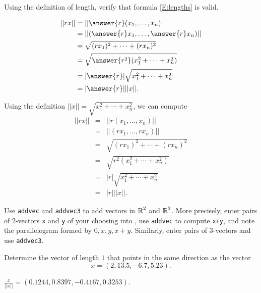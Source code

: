 \documentclass{ximera}
\begin{document}
\begin{exercise}  \label{c1.4.9A}
Using the definition of length, verify that formula \eqref{E:lengths} 
is valid.
\begin{prompt}
\begin{align*}
||rx|| & = ||\answer{r}(x_1,\dots,x_n)|| \\
& = ||(\answer{r}x_1,\dots,\answer{r}x_n)|| \\
& = \sqrt{(rx_1)^2 + \cdots + (rx_n)^2} \\
& = \sqrt{ \answer{r^2} (x_1^2 + \cdots + x_n^2)} \\
& = |\answer{r}|\sqrt{x_1^2 + \cdots + x_n^2} \\
& = |\answer{r}| ||x||.
\end{align*}
\end{prompt}

\begin{solution}
Using the definition $||x|| = \sqrt{x_1^2 + \cdots + x_n^2}$,
we can compute
\[
\begin{array}{rcl}
||rx|| & = & ||r(x_1,\dots,x_n)|| \\
& = & ||(rx_1,\dots,rx_n)|| \\
& = & \sqrt{(rx_1)^2 + \cdots + (rx_n)^2} \\
& = & \sqrt{r^2(x_1^2 + \cdots + x_n^2)} \\
& = & |r|\sqrt{x_1^2 + \cdots + x_n^2} \\
& = & |r| ||x||.
\end{array}
\]


\end{solution}
\end{exercise}


\CEXER

\begin{exercise} \label{c1.4.4}
Use {\tt addvec} and {\tt addvec3} to add vectors in $\mbox{$\Bbb{R}$}^2$ and
$\mbox{$\Bbb{R}$}^3$.  More precisely, enter pairs of $2$-vectors {\tt x} and {\tt y} 
of your choosing into \Matlabp, use {\tt addvec} to compute {\tt x+y},
and note the parallelogram formed by $0,x,y,x+y$.  Similarly, enter 
pairs of $3$-vectors and use {\tt addvec3}.

\begin{solution}

\end{solution}
\end{exercise}

\begin{exercise} \label{c1.4.5}
Determine the vector of length $1$ that points in the same direction
as the vector
\[
x=(2,13.5,-6.7,5.23).
\]

\begin{solution}

$\frac{x}{||x||} = (0.1244, 0.8397, -0.4167, 0.3253)$.

\end{solution}
\end{exercise}
\end{document}
